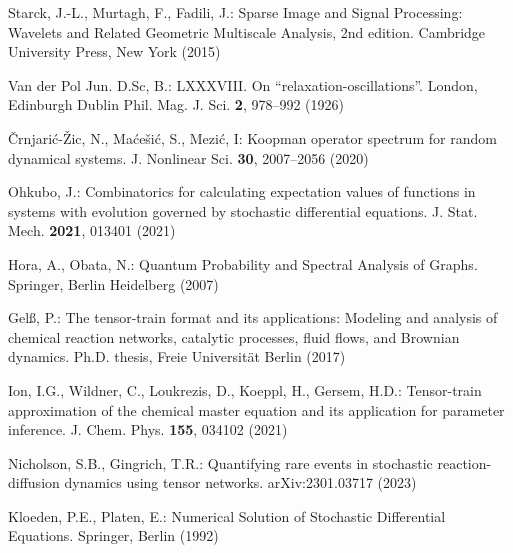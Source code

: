 \documentclass[sn-mathphys,Numbered]{sn-jnl}%
\theoremstyle{thmstyleone}%
\theoremstyle{thmstyletwo}%
\theoremstyle{thmstylethree}%
\begin{document}
\begin{thebibliography}{99}
Starck, J.-L., Murtagh, F., Fadili, J.:
Sparse Image and Signal Processing: Wavelets and Related Geometric Multiscale Analysis, 2nd edition.
Cambridge University Press, New York (2015)


Van der Pol Jun. D.Sc, B.:
LXXXVIII. On ``relaxation-oscillations''.
London, Edinburgh Dublin Phil. Mag. J. Sci. \textbf{2}, 978--992 (1926)


\v{C}rnjari\'{c}-\v{Z}ic, N., Ma\'{c}e\v{s}i\'{c}, S., Mezi\'{c}, I:
Koopman operator spectrum for random dynamical systems.
J. Nonlinear Sci. \textbf{30}, 2007--2056 (2020)




Ohkubo, J.:
Combinatorics for calculating expectation values of functions in systems with evolution governed by stochastic differential equations.
J. Stat. Mech. \textbf{2021}, 013401 (2021) 


Hora, A., Obata, N.: Quantum Probability and Spectral Analysis of Graphs. Springer, Berlin Heidelberg (2007)


Gel{\ss}, P.:
The tensor-train format and its applications: Modeling and analysis of chemical reaction networks, catalytic processes, fluid flows, and Brownian dynamics.
Ph.D. thesis, Freie Universit{\"a}t Berlin (2017)

Ion, I.G., Wildner, C., Loukrezis, D., Koeppl, H., Gersem, H.D.:
Tensor-train approximation of the chemical master equation and its application for parameter inference.
J. Chem. Phys. \textbf{155}, 034102 (2021)

Nicholson, S.B., Gingrich, T.R.:
Quantifying rare events in stochastic reaction-diffusion dynamics using tensor networks.
arXiv:2301.03717 (2023)



Kloeden, P.E., Platen, E.:
Numerical Solution of Stochastic Differential Equations.
Springer, Berlin (1992)




\end{thebibliography}
 
\end{document}
